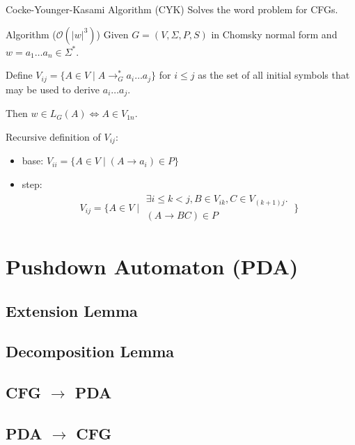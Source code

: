 \documentclass{beamer}
\def\spadding{\vspace{0.25cm}}
\begin{document}
\begin{frame}{Cocke-Younger-Kasami Algorithm (CYK)}
    Solves the word problem for CFGs.\pause

    \begin{block}{Algorithm ($\mathcal{O}(|w|^3)$)}
        Given $G = (V, \Sigma, P, S)$ in Chomsky normal form and $w = a_1 \dots a_n \in \Sigma^*$.\pause\par
        Define $V_{ij} = \{A \in V \mid A \to_G^* a_i \dots a_j\}$ for $i \leq j$ as the set of all initial symbols that may be used to derive $a_i \dots a_j$.\pause\par
        Then $w \in L_G(A) \iff A \in V_{1n}$.\pause\par\spadding
        Recursive definition of $V_{ij}$:
        \begin{itemize}
            \item base: $V_{ii} = \{A \in V \mid (A \to a_i) \in P\}$\pause
            \item step: \begin{align*}
                V_{ij} = \{A \in V \mid \substack{\exists i \leq k < j, B \in V_{ik}, C \in V_{(k+1)j}.\ \\ (A \to BC) \in P}\}
            \end{align*}
        \end{itemize}
    \end{block}
\end{frame}

\section{Pushdown Automaton (PDA)}

\subsection{Extension Lemma}

\subsection{Decomposition Lemma}

\subsection{CFG $\to$ PDA}

\subsection{PDA $\to$ CFG}
\end{document}
